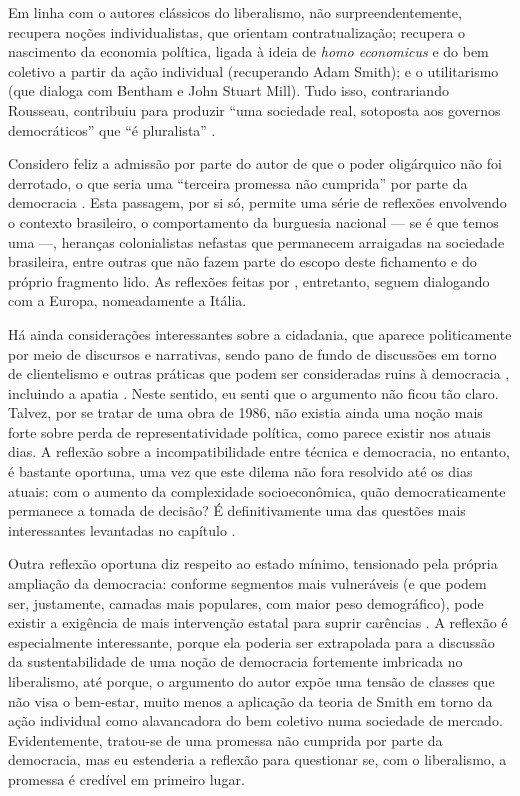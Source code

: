 \documentclass[
article,			%
11pt,				%
oneside,			%
a4paper,			%
english,			%
brazil,				%
sumario=tradicional
]{abntex2}
\begin{document}
	Em linha com o autores clássicos do liberalismo, não surpreendentemente, \cite[p. 6]{bobbio1986a} recupera noções individualistas, que orientam contratualização; recupera o nascimento da economia política, ligada à ideia de \textit{homo economicus} e do bem coletivo a partir da ação individual (recuperando Adam Smith); e o utilitarismo (que dialoga com Bentham e John Stuart Mill). Tudo isso, contrariando Rousseau, contribuiu para produzir ``uma sociedade real, sotoposta aos governos democráticos'' que ``é pluralista'' \cite[p. 7]{bobbio1986a}.
	
	Considero feliz a admissão por parte do autor de que o poder oligárquico não foi derrotado, o que seria uma ``terceira promessa não cumprida'' por parte da democracia \cite[p. 10]{bobbio1986a}. Esta passagem, por si só, permite uma série de reflexões envolvendo o contexto brasileiro, o comportamento da burguesia nacional --- se é que temos uma ---, heranças colonialistas nefastas que permanecem arraigadas na sociedade brasileira, entre outras que não fazem parte do escopo deste fichamento e do próprio fragmento lido. As reflexões feitas por \cite[p. 10--12, 16]{bobbio1986a}, entretanto, seguem dialogando com a Europa, nomeadamente a Itália.
	
	Há ainda considerações interessantes sobre a cidadania, que aparece politicamente por meio de discursos e narrativas, sendo pano de fundo de discussões em torno de clientelismo e outras práticas que podem ser consideradas ruins à democracia \cite[p. 17]{bobbio1986a}, incluindo a apatia \cite[p. 16]{bobbio1986a}. Neste sentido, eu senti que o argumento não ficou tão claro. Talvez, por se tratar de uma obra de 1986, não existia ainda uma noção mais forte sobre perda de representatividade política, como parece existir nos atuais dias. A reflexão sobre a incompatibilidade entre técnica e democracia, no entanto, é bastante oportuna, uma vez que este dilema não fora resolvido até os dias atuais: com o aumento da complexidade socioeconômica, quão democraticamente permanece a tomada de decisão? É definitivamente uma das questões mais interessantes levantadas no capítulo \cite[p. 18]{bobbio1986a}.
	
	Outra reflexão oportuna diz respeito ao estado mínimo, tensionado pela própria ampliação da democracia: conforme segmentos mais vulneráveis (e que podem ser, justamente, camadas mais populares, com maior peso demográfico), pode existir a exigência de mais intervenção estatal para suprir carências \cite[p. 18]{bobbio1986a}. A reflexão é especialmente interessante, porque ela poderia ser extrapolada para a discussão da sustentabilidade de uma noção de democracia fortemente imbricada no liberalismo, até porque, o argumento do autor expõe uma tensão de classes que não visa o bem-estar, muito menos a aplicação da teoria de Smith em torno da ação individual como alavancadora do bem coletivo numa sociedade de mercado. Evidentemente, tratou-se de uma promessa não cumprida por parte da democracia, mas eu estenderia a reflexão para questionar se, com o liberalismo, a promessa é credível em primeiro lugar.
	
\end{document}
